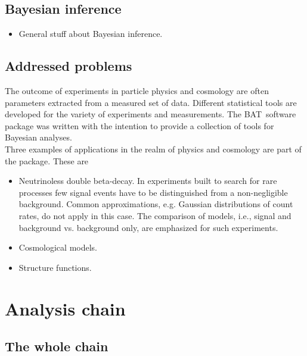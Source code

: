 \documentclass[11pt, a4paper]{article}
\newcommand{\BAT}{{\sc BAT}}
\begin{document}
\subsection{Bayesian inference} 

\begin{itemize} 
\item General stuff about Bayesian inference. 
\end{itemize} 

\subsection{Addressed problems} 
\label{subsection:problems} 

The outcome of experiments in particle physics and cosmology are often
parameters extracted from a measured set of data. Different
statistical tools are developed for the variety of experiments and
measurements. The \BAT\ software package was written with the intention
to provide a collection of tools for Bayesian analyses. \\ 

Three examples of applications in the realm of physics and cosmology
are part of the package. These are 

\begin{itemize}
% 
\item Neutrinoless double beta-decay. In experiments built to search
for rare processes few signal events have to be distinguished from a
non-negligible background. Common approximations, e.g. Gaussian
distributions of count rates, do not apply in this case. The
comparison of models, i.e., signal and background vs. background only,
are emphasized for such experiments. 
% 
\item Cosmological models.  
%
\item Structure functions. 
%
\end{itemize}


\section{Analysis chain}

\subsection{The whole chain} 
\end{document}
